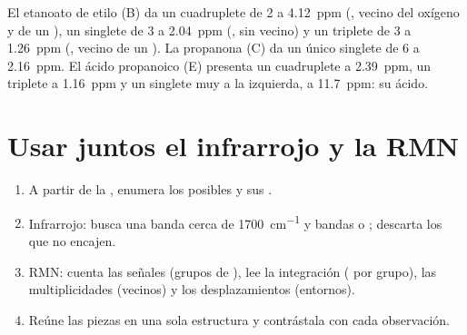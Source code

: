 \begin{example}\label{ex:g12:proton-nmr:reading}
El etanoato de etilo (B) da un cuadruplete de 2  a \qty{4.12}{ppm}
(, vecino del oxígeno y de un ), un singlete de 3
 a \qty{2.04}{ppm} (, sin  vecino) y un
triplete de 3  a \qty{1.26}{ppm} (, vecino de un
). La propanona (C) da un único singlete de 6  a
\qty{2.16}{ppm}. El ácido propanoico (E) presenta un cuadruplete a
\qty{2.39}{ppm}, un triplete a \qty{1.16}{ppm} y un singlete muy a la
izquierda, a \qty{11.7}{ppm}: su  ácido.
\end{example}

\section{Usar juntos el infrarrojo y la RMN}


\begin{method}\label{met:g12:proton-nmr:identify}
\begin{enumerate}
  \item A partir de la , enumera los  posibles y
        sus .
  \item Infrarrojo: busca una banda  cerca de \qty{1700}{cm^{-1}}
        y bandas  o ; descarta los  que no
        encajen.
  \item RMN: cuenta las señales (grupos de ), lee la
        integración ( por grupo), las multiplicidades (vecinos)
        y los desplazamientos (entornos).
  \item Reúne las piezas en una sola estructura y contrástala con cada
        observación.
\end{enumerate}
\end{method}

